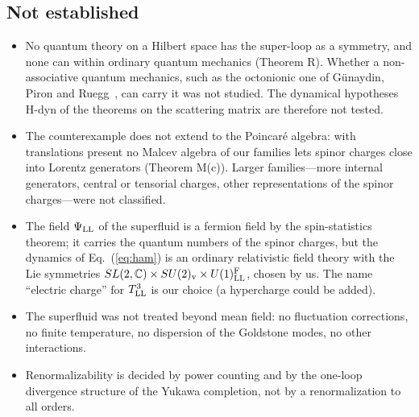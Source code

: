 \subsection{Not established}

\begin{itemize}
\item No quantum theory on a Hilbert space has the super-loop as a symmetry, and none can within
ordinary quantum mechanics (Theorem R). Whether a non-associative quantum mechanics, such as the
octonionic one of G\"unaydin, Piron and Ruegg~\cite{GunaydinPironRuegg1978}, can carry it was not
studied. The dynamical hypotheses H-dyn of the theorems on the scattering matrix are therefore not
tested.
\item The counterexample does not extend to the Poincar\'e algebra: with translations present no Malcev
algebra of our families lets spinor charges close into Lorentz generators (Theorem M(c)). Larger
families---more internal generators, central or tensorial charges, other representations of the
spinor charges---were not classified.
\item The field $\Psi_{\rm LL}$ of the superfluid is a fermion field by the spin-statistics theorem; it
carries the quantum numbers of the spinor charges, but the dynamics of Eq.~(\ref{eq:ham}) is an
ordinary relativistic field theory with the Lie symmetries $SL(2,\mathbb C)\times SU(2)_{\rm v}\times
U(1)^{\rm F}_{\rm LL}$, chosen by us. The name ``electric charge'' for $T^3_{\rm LL}$ is our choice (a
hypercharge could be added).
\item The superfluid was not treated beyond mean field: no fluctuation corrections, no finite
temperature, no dispersion of the Goldstone modes, no other interactions.
\item Renormalizability is decided by power counting and by the one-loop divergence structure of the
Yukawa completion, not by a renormalization to all orders.
\end{itemize}
